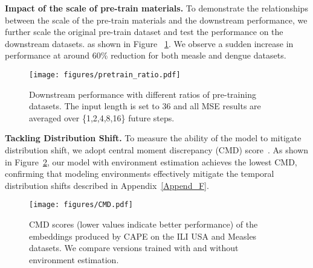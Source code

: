 \textbf{Impact of the scale of pre-train materials.}
To demonstrate the relationships between the scale of the pre-train materials and the downstream performance, we further scale the original pre-train dataset and test the performance on the downstream datasets. as shown in Figure ~\ref{fig: pretrain_scale}.  We observe a sudden increase in performance at around 60\% reduction for both measle and dengue datasets.

    
    
    


\begin{figure}[htbp]
    \centering
    \texttt{[image: figures/pretrain\_ratio.pdf]}
    
    \caption{Downstream performance with different ratios of pre-training datasets. The input length is set to 36 and all MSE results are averaged over \{1,2,4,8,16\} future steps.}
    
    \label{fig: pretrain_scale}
\end{figure} 



\textbf{Tackling Distribution Shift.} 
To measure the ability of the model to mitigate distribution shift, we adopt central moment discrepancy (CMD) score~\cite{jin2022empowering}. As shown in Figure~\ref{fig:CMD}, our model with environment estimation achieves the lowest CMD, confirming that modeling environments effectively mitigate the temporal distribution shifts described in Appendix~\ref{Append_F}.


\begin{figure}[htbp]
    \centering
    \texttt{[image: figures/CMD.pdf]}

    \caption{CMD scores (lower values indicate better performance) of the embeddings produced by CAPE on the ILI USA and Measles datasets. We compare versions trained with and without environment estimation.}
    \label{fig:CMD}
\end{figure}


